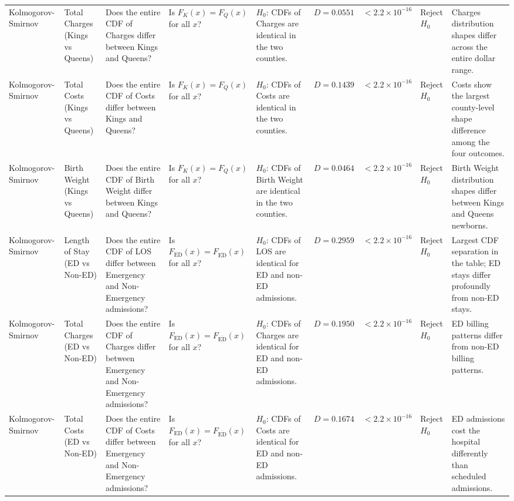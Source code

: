\documentclass[12pt]{article}
\begin{document}
\begin{landscape}
\begin{scriptsize}
\begin{longtable}{p{2.0cm} p{2.4cm} p{3.0cm} p{2.7cm} p{2.5cm} p{1.7cm} p{1.3cm} p{1.3cm} p{3.0cm}}
Kolmogorov-Smirnov & Total Charges (Kings vs Queens) & Does the entire CDF of Charges differ between Kings and Queens? & Is $F_{K}(x) = F_{Q}(x)$ for all $x$? & $H_0$: CDFs of Charges are identical in the two counties. & $D = 0.0551$ & $< 2.2 \times 10^{-16}$ & Reject $H_0$ & Charges distribution shapes differ across the entire dollar range. \\

Kolmogorov-Smirnov & Total Costs (Kings vs Queens) & Does the entire CDF of Costs differ between Kings and Queens? & Is $F_{K}(x) = F_{Q}(x)$ for all $x$? & $H_0$: CDFs of Costs are identical in the two counties. & $D = 0.1439$ & $< 2.2 \times 10^{-16}$ & Reject $H_0$ & Costs show the largest county-level shape difference among the four outcomes. \\

Kolmogorov-Smirnov & Birth Weight (Kings vs Queens) & Does the entire CDF of Birth Weight differ between Kings and Queens? & Is $F_{K}(x) = F_{Q}(x)$ for all $x$? & $H_0$: CDFs of Birth Weight are identical in the two counties. & $D = 0.0464$ & $< 2.2 \times 10^{-16}$ & Reject $H_0$ & Birth Weight distribution shapes differ between Kings and Queens newborns. \\

Kolmogorov-Smirnov & Length of Stay (ED vs Non-ED) & Does the entire CDF of LOS differ between Emergency and Non-Emergency admissions? & Is $F_{\mathrm{ED}}(x) = F_{\overline{\mathrm{ED}}}(x)$ for all $x$? & $H_0$: CDFs of LOS are identical for ED and non-ED admissions. & $D = 0.2959$ & $< 2.2 \times 10^{-16}$ & Reject $H_0$ & Largest CDF separation in the table; ED stays differ profoundly from non-ED stays. \\

Kolmogorov-Smirnov & Total Charges (ED vs Non-ED) & Does the entire CDF of Charges differ between Emergency and Non-Emergency admissions? & Is $F_{\mathrm{ED}}(x) = F_{\overline{\mathrm{ED}}}(x)$ for all $x$? & $H_0$: CDFs of Charges are identical for ED and non-ED admissions. & $D = 0.1950$ & $< 2.2 \times 10^{-16}$ & Reject $H_0$ & ED billing patterns differ from non-ED billing patterns. \\

Kolmogorov-Smirnov & Total Costs (ED vs Non-ED) & Does the entire CDF of Costs differ between Emergency and Non-Emergency admissions? & Is $F_{\mathrm{ED}}(x) = F_{\overline{\mathrm{ED}}}(x)$ for all $x$? & $H_0$: CDFs of Costs are identical for ED and non-ED admissions. & $D = 0.1674$ & $< 2.2 \times 10^{-16}$ & Reject $H_0$ & ED admissions cost the hospital differently than scheduled admissions. \\


\end{longtable}
\end{scriptsize}
\end{landscape}
\end{document}

